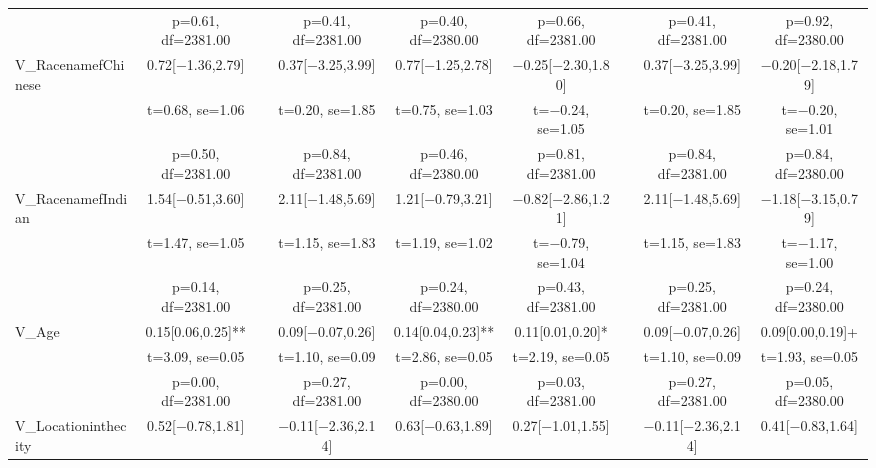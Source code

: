 \documentclass[]{report}
\begin{document}
\begin{table}
{\begin{tabular}[t]{lcccccccc}
			& p=\num{0.61}, df=\num{2381.00} &  & p=\num{0.41}, df=\num{2381.00} & p=\num{0.40}, df=\num{2380.00} & p=\num{0.66}, df=\num{2381.00} &  & p=\num{0.41}, df=\num{2381.00} & p=\num{0.92}, df=\num{2380.00}\\
			V\_RacenamefChinese & \num{0.72}[\num{-1.36},\num{2.79}] &  & \num{0.37}[\num{-3.25},\num{3.99}] & \num{0.77}[\num{-1.25},\num{2.78}] & \num{-0.25}[\num{-2.30},\num{1.80}] &  & \num{0.37}[\num{-3.25},\num{3.99}] & \num{-0.20}[\num{-2.18},\num{1.79}]\\
			& t=\num{0.68}, se=\num{1.06} &  & t=\num{0.20}, se=\num{1.85} & t=\num{0.75}, se=\num{1.03} & t=\num{-0.24}, se=\num{1.05} &  & t=\num{0.20}, se=\num{1.85} & t=\num{-0.20}, se=\num{1.01}\\
			& p=\num{0.50}, df=\num{2381.00} &  & p=\num{0.84}, df=\num{2381.00} & p=\num{0.46}, df=\num{2380.00} & p=\num{0.81}, df=\num{2381.00} &  & p=\num{0.84}, df=\num{2381.00} & p=\num{0.84}, df=\num{2380.00}\\
			V\_RacenamefIndian & \num{1.54}[\num{-0.51},\num{3.60}] &  & \num{2.11}[\num{-1.48},\num{5.69}] & \num{1.21}[\num{-0.79},\num{3.21}] & \num{-0.82}[\num{-2.86},\num{1.21}] &  & \num{2.11}[\num{-1.48},\num{5.69}] & \num{-1.18}[\num{-3.15},\num{0.79}]\\
			& t=\num{1.47}, se=\num{1.05} &  & t=\num{1.15}, se=\num{1.83} & t=\num{1.19}, se=\num{1.02} & t=\num{-0.79}, se=\num{1.04} &  & t=\num{1.15}, se=\num{1.83} & t=\num{-1.17}, se=\num{1.00}\\
			& p=\num{0.14}, df=\num{2381.00} &  & p=\num{0.25}, df=\num{2381.00} & p=\num{0.24}, df=\num{2380.00} & p=\num{0.43}, df=\num{2381.00} &  & p=\num{0.25}, df=\num{2381.00} & p=\num{0.24}, df=\num{2380.00}\\
			V\_Age & \num{0.15}[\num{0.06},\num{0.25}]** &  & \num{0.09}[\num{-0.07},\num{0.26}] & \num{0.14}[\num{0.04},\num{0.23}]** & \num{0.11}[\num{0.01},\num{0.20}]* &  & \num{0.09}[\num{-0.07},\num{0.26}] & \num{0.09}[\num{0.00},\num{0.19}]+\\
			& t=\num{3.09}, se=\num{0.05} &  & t=\num{1.10}, se=\num{0.09} & t=\num{2.86}, se=\num{0.05} & t=\num{2.19}, se=\num{0.05} &  & t=\num{1.10}, se=\num{0.09} & t=\num{1.93}, se=\num{0.05}\\
			& p=\num{0.00}, df=\num{2381.00} &  & p=\num{0.27}, df=\num{2381.00} & p=\num{0.00}, df=\num{2380.00} & p=\num{0.03}, df=\num{2381.00} &  & p=\num{0.27}, df=\num{2381.00} & p=\num{0.05}, df=\num{2380.00}\\
			V\_Locationinthecity & \num{0.52}[\num{-0.78},\num{1.81}] &  & \num{-0.11}[\num{-2.36},\num{2.14}] & \num{0.63}[\num{-0.63},\num{1.89}] & \num{0.27}[\num{-1.01},\num{1.55}] &  & \num{-0.11}[\num{-2.36},\num{2.14}] & \num{0.41}[\num{-0.83},\num{1.64}]\\

\end{tabular}}
\end{table}
\end{document}

